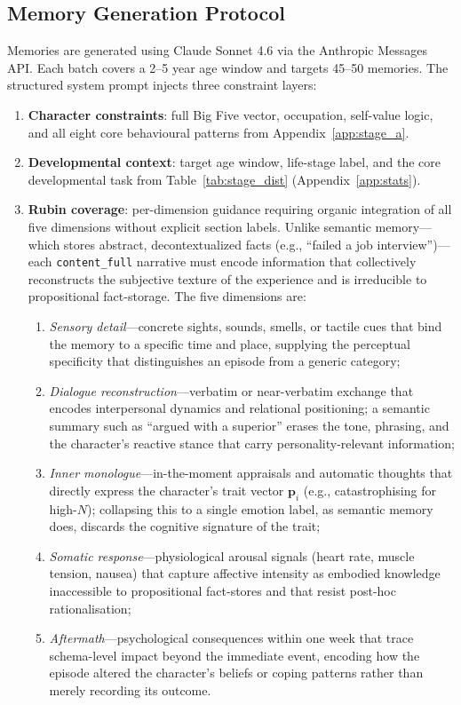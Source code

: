\subsection{Memory Generation Protocol}
\label{app:stage_c}

Memories are generated using Claude Sonnet 4.6 via the Anthropic Messages API. Each batch covers a 2--5 year age window and targets 45--50 memories. The structured system prompt injects three constraint layers:

\begin{enumerate}[leftmargin=1.5em, itemsep=2pt]
  \item \textbf{Character constraints}: full Big Five vector, occupation, self-value logic, and all eight core behavioural patterns from Appendix~\ref{app:stage_a}.
  \item \textbf{Developmental context}: target age window, life-stage label, and the core developmental task from Table~\ref{tab:stage_dist} (Appendix~\ref{app:stats}).
  \item \textbf{Rubin coverage}: per-dimension guidance requiring organic integration of all five dimensions without explicit section labels.
  Unlike semantic memory---which stores abstract, decontextualized facts (e.g., ``failed a job interview'')---each \texttt{content\_full} narrative must encode information that collectively reconstructs the subjective texture of the experience and is irreducible to propositional fact-storage.
  The five dimensions are:
  \begin{enumerate}[leftmargin=1.5em, itemsep=1pt]
    \item \textit{Sensory detail}—concrete sights, sounds, smells, or tactile cues that bind the memory to a specific time and place, supplying the perceptual specificity that distinguishes an episode from a generic category;
    \item \textit{Dialogue reconstruction}—verbatim or near-verbatim exchange that encodes interpersonal dynamics and relational positioning; a semantic summary such as ``argued with a superior'' erases the tone, phrasing, and the character's reactive stance that carry personality-relevant information;
    \item \textit{Inner monologue}—in-the-moment appraisals and automatic thoughts that directly express the character's trait vector $\mathbf{p}_i$ (e.g., catastrophising for high-$N$); collapsing this to a single emotion label, as semantic memory does, discards the cognitive signature of the trait;
    \item \textit{Somatic response}—physiological arousal signals (heart rate, muscle tension, nausea) that capture affective intensity as embodied knowledge inaccessible to propositional fact-stores and that resist post-hoc rationalisation;
    \item \textit{Aftermath}—psychological consequences within one week that trace schema-level impact beyond the immediate event, encoding how the episode altered the character's beliefs or coping patterns rather than merely recording its outcome.
  \end{enumerate}
\end{enumerate}

